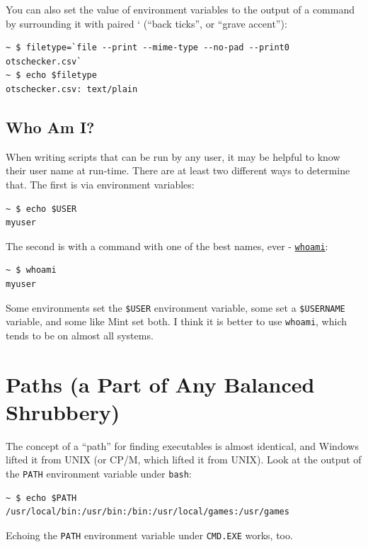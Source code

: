 \documentclass[10pt,]{book}
\numberwithin{figure}{chapter}
\DeclareRobustCommand{\fref}[1]{\ifxetex{(Figure \ref{fig:#1})}\fi}
\begin{document}
You can also set the value of environment variables to the output of a
command by surrounding it with paired ` (``back ticks'', or ``grave
accent''):

\begin{verbatim}
~ $ filetype=`file --print --mime-type --no-pad --print0 otschecker.csv`
~ $ echo $filetype
otschecker.csv: text/plain
\end{verbatim}

\subsection{Who Am I?}\label{who-am-i}

When writing scripts that can be run by any user, it may be helpful to
know their user name at run-time. There are at least two different ways
to determine that. The first is via environment variables:

\begin{verbatim}
~ $ echo $USER
myuser
\end{verbatim}

The second is with a command with one of the best names, ever -
\href{http://linux.die.net/man/1/whoami}{\texttt{whoami}}:

\begin{verbatim}
~ $ whoami
myuser
\end{verbatim}

Some environments set the \texttt{\$USER} environment variable, some set
a \texttt{\$USERNAME} variable, and some like Mint set both. I think it
is better to use \texttt{whoami}, which tends to be on almost all
systems.

\section{Paths (a Part of Any Balanced
Shrubbery)}\label{paths-a-part-of-any-balanced-shrubbery}

The concept of a ``path'' for finding executables is almost identical,
and Windows lifted it from UNIX (or CP/M, which lifted it from UNIX).
Look at the output of the \texttt{PATH} environment variable under
\texttt{bash}:

\begin{verbatim}
~ $ echo $PATH
/usr/local/bin:/usr/bin:/bin:/usr/local/games:/usr/games
\end{verbatim}

Echoing the \texttt{PATH} environment variable under \texttt{CMD.EXE}
\fref{echo-path-in-cmd} works, too.
\end{document}
